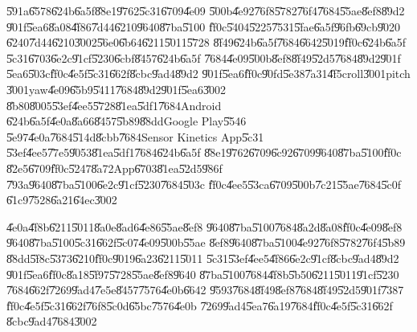 \U{591a}\U{6578}\U{624b}\U{6a5f}\U{88e1}\U{9762}\U{5c31}\U{6709}\U{4e09}%
\U{500b}\U{4e92}\U{76f8}\U{5782}\U{76f4}\U{7684}\U{55ae}\U{8ef8}\U{89d2}%
\U{901f}\U{5ea6}\U{8a08}\U{4f86}\U{7d44}\U{6210}\U{9640}\U{87ba}\U{5100}%
\U{ff0c}\U{5404}\U{5225}\U{7531}\U{5fae}\U{6a5f}\U{96fb}\U{69cb}\U{9020}%
\U{6240}\U{7d44}\U{6210}\U{3002}\U{56e0}\U{6b64}\U{6211}\U{5011}\U{5728}%
\U{8f49}\U{624b}\U{6a5f}\U{7684}\U{6642}\U{5019}\U{ff0c}\U{624b}\U{6a5f}%
\U{5c31}\U{6703}\U{6e2c}\U{91cf}\U{5230}\U{6cbf}\U{8457}\U{624b}\U{6a5f}%
\U{7684}\U{4e09}\U{500b}\U{8ef8}\U{8f49}\U{52d5}\U{7684}\U{89d2}\U{901f}%
\U{5ea6}\U{503c}\U{ff0c}\U{4e5f}\U{5c31}\U{662f}\U{8cbc}\U{9ad4}\U{89d2}%
\U{901f}\U{5ea6}\U{ff0c}\U{90fd}\U{5e38}\U{7a31}\U{4f5c}roll\U{3001}pitch%
\U{3001}yaw\U{4e09}\U{65b9}\U{5411}\U{7684}\U{89d2}\U{901f}\U{5ea6}\U{3002}%
\U{8b80}\U{8005}\U{53ef}\U{4ee5}\U{5728}\U{81ea}\U{5df1}\U{7684}Android%
\U{624b}\U{6a5f}\U{4e0a}\U{8a66}\U{8457}\U{5b89}\U{88dd}Google Play\U{5546}%
\U{5e97}\U{4e0a}\U{7684}\U{514d}\U{8cbb}\U{7684}Sensor Kinetics App\U{5c31}%
\U{53ef}\U{4ee5}\U{77e5}\U{9053}\U{81ea}\U{5df1}\U{7684}\U{624b}\U{6a5f}%
\U{88e1}\U{9762}\U{6709}\U{6c92}\U{6709}\U{9640}\U{87ba}\U{5100}\U{ff0c}%
\U{82e5}\U{6709}\U{ff0c}\U{5247}\U{8a72}App\U{6703}\U{81ea}\U{52d5}\U{986f}%
\U{793a}\U{9640}\U{87ba}\U{5100}\U{6e2c}\U{91cf}\U{5230}\U{7684}\U{503c}%
\U{ff0c}\U{4ee5}\U{53ca}\U{6709}\U{500b}\U{7c21}\U{55ae}\U{7684}\U{5c0f}%
\U{61c9}\U{7528}\U{6a21}\U{64ec}\U{3002}

\bigskip

\U{4e0a}\U{4f8b}\U{6211}\U{5011}\U{8a0e}\U{8ad6}\U{4e86}\U{55ae}\U{8ef8}%
\U{9640}\U{87ba}\U{5100}\U{7684}\U{8a2d}\U{8a08}\U{ff0c}\U{4e09}\U{8ef8}%
\U{9640}\U{87ba}\U{5100}\U{5c31}\U{662f}\U{5c07}\U{4e09}\U{500b}\U{55ae}%
\U{8ef8}\U{9640}\U{87ba}\U{5100}\U{4e92}\U{76f8}\U{5782}\U{76f4}\U{5b89}%
\U{88dd}\U{5f8c}\U{5373}\U{6210}\U{ff0c}\U{9019}\U{6a23}\U{6211}\U{5011}%
\U{5c31}\U{53ef}\U{4ee5}\U{4f86}\U{6e2c}\U{91cf}\U{8cbc}\U{9ad4}\U{89d2}%
\U{901f}\U{5ea6}\U{ff0c}\U{8a18}\U{5f97}\U{5728}\U{55ae}\U{8ef8}\U{9640}%
\U{87ba}\U{5100}\U{7684}\U{4f8b}\U{5b50}\U{6211}\U{5011}\U{91cf}\U{5230}%
\U{7684}\U{662f}\U{7269}\U{9ad4}\U{7e5e}\U{8457}\U{7576}\U{4e0b}\U{6642}%
\U{9593}\U{7684}\U{8f49}\U{8ef8}\U{7684}\U{8f49}\U{52d5}\U{901f}\U{7387}%
\U{ff0c}\U{4e5f}\U{5c31}\U{662f}\U{76f8}\U{5c0d}\U{65bc}\U{7576}\U{4e0b}%
\U{7269}\U{9ad4}\U{5ea7}\U{6a19}\U{7684}\U{ff0c}\U{4e5f}\U{5c31}\U{662f}%
\U{8cbc}\U{9ad4}\U{7684}\U{3002}

\bigskip

